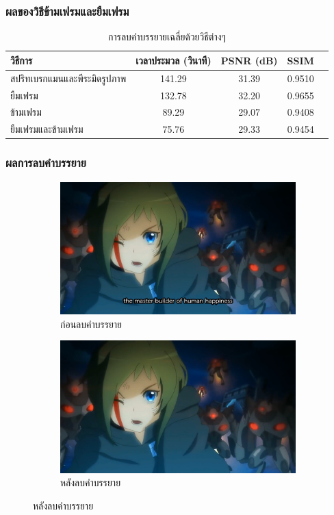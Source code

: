 \documentclass[xcolor=dvipsnames, xetex,serif]{beamer}
\numberwithin{equation}{section}
\begin{document}
    \begin{frame}
        \frametitle{ผลของวิธีข้ามเฟรมและยืมเฟรม}
        \begin{table}[H]
            \centering
            \begin{tabular}[ht]{|l|c|c|c|c|}
                \hline
                วิธีการ  & เวลาประมวล  (วินาที) & PSNR (dB) & SSIM \\
                \hline
                สปริทเบรกแมนและพีระมิดรูปภาพ & 141.29 & 31.39  &  0.9510\\
                ยืมเฟรม & 132.78 & 32.20 & 0.9655\\
                ข้ามเฟรม & 89.29 & 29.07 & 0.9408 \\
                ยืมเฟรมและข้ามเฟรม & 75.76 & 29.33 & 0.9454 \\
                \hline
            \end{tabular}
            \caption{การลบคำบรรยายเฉลี่ยด้วยวิธีต่างๆ}
        \end{table}	
    \end{frame}
    \begin{frame}
        \frametitle{ผลการลบคำบรรยาย}
        \begin{figure}[H]
            \centering
            \begin{subfigure}{0.4\linewidth}
                \centering
                \includegraphics[width=0.80\linewidth]{images/subtitle-remove/beforesubtitleremove.png}
                \caption{ก่อนลบคำบรรยาย}
                \label{image:ssim_location_prev}
            \end{subfigure}
            \begin{subfigure}{0.4\linewidth}
                \centering
                \includegraphics[width=0.80\linewidth]{images/subtitle-remove/aftersubtitleremove.png}
                \caption{หลังลบคำบรรยาย}
                \label{image:ssim_location_curr}
            \end{subfigure}
        \end{figure}
    \end{frame}
\end{document}
